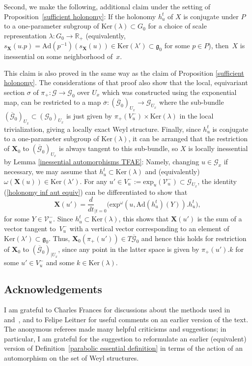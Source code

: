 \documentclass[pdftex]{sigma}
\def\R{\mathbb{R}}
\def\g{\mathfrak{g}}
\def\Gbdle{\mathcal{G}}
\theoremstyle{plain}
\theoremstyle{definition}
\begin{document}
Second, we make the following, additional claim under the setting of Proposition~\ref{sufficient holonomy}: If the holonomy $h_u^t$ of $X$ is conjugate under $P$ to a one-parameter subgroup of $\mathrm{Ker}(\lambda) \subset G_0$ for a choice of scale representation $\lambda: G_0 \rightarrow \R_+$ (equivalently, $s_{\mathbf{X}}(u.p) = \mathrm{Ad}(p^{-1})(s_{\mathbf{X}}(u)) \in \mathrm{Ker}(\lambda') \subset \g_0$ for some $p \in P$), then~$X$ is inessential on some neighborhood of~$x$.

This claim is also proved in the same way as the claim of Proposition \ref{sufficient holonomy}. The considerations of that proof also show that the local, equivariant section $\sigma$ of $\pi_+: \Gbdle \rightarrow \Gbdle_0$ over $U_x$ which was constructed using the exponential map, can be restricted to a map $\overline{\sigma}: (\overline{\Gbdle}_0)_{U_x} \rightarrow \Gbdle_{U_x}$ where the sub-bundle $(\overline{\Gbdle}_0)_{U_x} \subset (\Gbdle_0)_{U_x}$ is just given by $\pi_+(V_u^-) \times \mathrm{Ker}(\lambda)$ in the local trivialization, giving a locally exact Weyl structure. Finally, since $h_u^t$ is conjugate to a one-parameter subgroup of $\mathrm{Ker}(\lambda)$, it can be arranged that the restriction of $\mathbf{X}_0$ to $(\overline{\Gbdle}_0)_{U_x}$ is always tangent to this sub-bundle, so $X$ is locally inessential by Lemma \ref{inessential automorphisms TFAE}: Namely, changing $u \in \Gbdle_x$ if necessary, we may assume that $h_u^t \subset \mathrm{Ker}(\lambda)$ and (equivalently) $\omega(\mathbf{X}(u)) \in \mathrm{Ker}(\lambda')$. For any $u' \in V_u^- := \mathrm{exp}_u(\mathcal{V}_u^-) \subset \Gbdle_{U_x}$, the identity (\ref{holonomy inf aut equiv}) can be dif\/ferentiated to show that
\[
\mathbf{X}(u') = \frac{d}{dt}_{\vert t=0}\big(\mathrm{exp}^{\omega}(u,\mathrm{Ad}(h_u^t)(Y)).h_u^t\big),
\]
for some $Y \in \mathcal{V}_u^-$. Since $h_u^t \subset \mathrm{Ker}(\lambda)$, this shows that $\mathbf{X}(u')$ is the sum of a vector tangent to~$V_u^-$ with a vertical vector corresponding to an element of $\mathrm{Ker}(\lambda') \subset \g_0$. Thus, $\mathbf{X}_0(\pi_+(u')) \in T\overline{\Gbdle}_0$ and hence this holds for restriction of $\mathbf{X}_0$ to $(\overline{\Gbdle}_0)_{\vert U_x}$, since any point in the latter space is given by $\pi_+(u').k$ for some $u' \in V_u^-$ and some $k \in \mathrm{Ker}(\lambda)$.

\subsection*{Acknowledgements} I am grateful to Charles Frances for discussions about the methods used in~\cite{Frances} and~\cite{Frances3}, and to Felipe Leitner for useful comments on an earlier version of the text. The anonymous referees made many helpful criticisms and suggestions; in particular, I am grateful for the suggestion to reformulate an earlier (equivalent) version of Def\/inition~\ref{parabolic essential definition} in terms of the action of an automorphism on the set of Weyl structures.
\end{document}
